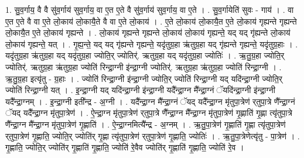 \documentclass[17pt]{extarticle}
\begin{document}
1. सु॒व॒र्गाय॒ वै वै सु॑व॒र्गाय॑ सुव॒र्गाय॒ वा ए॒त ए॒ते वै सु॑व॒र्गाय॑ सुव॒र्गाय॒ वा ए॒ते । . सु॒व॒र्गायेति॑ सुवः - गाय॑ । . वा ए॒त ए॒ते वै वा ए॒ते लो॒काय॑ लो॒कायै॒ते वै वा ए॒ते लो॒काय॑ । . ए॒ते लो॒काय॑ लो॒कायै॒त ए॒ते लो॒काय॑ गृह्यन्ते गृह्यन्ते लो॒कायै॒त ए॒ते लो॒काय॑ गृह्यन्ते । . लो॒काय॑ गृह्यन्ते गृह्यन्ते लो॒काय॑ लो॒काय॑ गृह्यन्ते॒ यद् यद् गृ॑ह्यन्ते लो॒काय॑ लो॒काय॑ गृह्यन्ते॒ यत् । . गृ॒ह्य॒न्ते॒ यद् यद् गृ॑ह्यन्ते गृह्यन्ते॒ यदृ॑तुग्र॒हा ऋ॑तुग्र॒हा यद् गृ॑ह्यन्ते गृह्यन्ते॒ यदृ॑तुग्र॒हाः । . यदृ॑तुग्र॒हा ऋ॑तुग्र॒हा यद् यदृ॑तुग्र॒हा ज्योति॒र् ज्योतिर्॑. ऋतुग्र॒हा यद् यदृ॑तुग्र॒हा ज्योतिः॑ । . ऋ॒तु॒ग्र॒हा ज्योति॒र् ज्योतिर्॑. ऋतुग्र॒हा ऋ॑तुग्र॒हा ज्योति॑ रिन्द्रा॒ग्नी इ॑न्द्रा॒ग्नी ज्योतिर्॑. ऋतुग्र॒हा ऋ॑तुग्र॒हा ज्योति॑ रिन्द्रा॒ग्नी । . ऋ॒तु॒ग्र॒हा इत्यृ॑तु - ग्र॒हाः । . ज्योति॑ रिन्द्रा॒ग्नी इ॑न्द्रा॒ग्नी ज्योति॒र् ज्योति॑ रिन्द्रा॒ग्नी यद् यदि॑न्द्रा॒ग्नी ज्योति॒र् ज्योति॑ रिन्द्रा॒ग्नी यत् । . इ॒न्द्रा॒ग्नी यद् यदि॑न्द्रा॒ग्नी इ॑न्द्रा॒ग्नी यदै᳚न्द्रा॒ग्न मै᳚न्द्रा॒ग्नं ॅयदि॑न्द्रा॒ग्नी इ॑न्द्रा॒ग्नी यदै᳚न्द्रा॒ग्नम् । . इ॒न्द्रा॒ग्नी इती᳚न्द्र - अ॒ग्नी । . यदै᳚न्द्रा॒ग्न मै᳚न्द्रा॒ग्नं ॅयद् यदै᳚न्द्रा॒ग्न मृ॑तुपा॒त्रेण॑ र्‌तुपा॒त्रे णै᳚न्द्रा॒ग्नं ॅयद् 
यदै᳚न्द्रा॒ग्न मृ॑तुपा॒त्रेण॑ । . ऐ॒न्द्रा॒ग्न मृ॑तुपा॒त्रेण॑ र्‌तुपा॒त्रे णै᳚न्द्रा॒ग्न मै᳚न्द्रा॒ग्न मृ॑तुपा॒त्रेण॑ गृ॒ह्णाति॑ गृ॒ह्णा त्यृ॑तुपा॒त्रे णै᳚न्द्रा॒ग्न मै᳚न्द्रा॒ग्न मृ॑तुपा॒त्रेण॑ गृ॒ह्णाति॑ । . ऐ॒न्द्रा॒ग्नमित्यै᳚न्द्र - अ॒ग्नम् । . ऋ॒तु॒पा॒त्रेण॑ गृ॒ह्णाति॑ गृ॒ह्णा त्यृ॑तुपा॒त्रेण॑ र्‌तुपा॒त्रेण॑ गृ॒ह्णाति॒ ज्योति॒र् ज्योति॑र् गृ॒ह्णा त्यृ॑तुपा॒त्रेण॑ र्‌तुपा॒त्रेण॑ गृ॒ह्णाति॒ ज्योतिः॑ । . ऋ॒तु॒पा॒त्रेणेत्यृ॑तु - पा॒त्रेण॑ । . गृ॒ह्णाति॒ ज्योति॒र् ज्योति॑र् गृ॒ह्णाति॑ गृ॒ह्णाति॒ ज्योति॑ रे॒वैव ज्योति॑र् गृ॒ह्णाति॑ गृ॒ह्णाति॒ ज्योति॑ रे॒व । \newline
\end{document}
